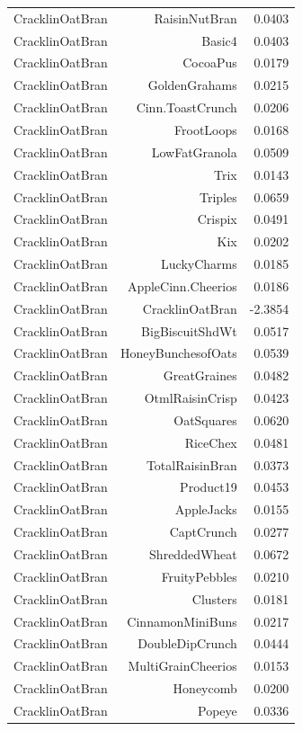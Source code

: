 \begin{longtable}{@{}lrr@{}}
CracklinOatBran & RaisinNutBran & 0.0403 \\
CracklinOatBran & Basic4 & 0.0403 \\
CracklinOatBran & CocoaPus & 0.0179 \\
CracklinOatBran & GoldenGrahams & 0.0215 \\
CracklinOatBran & Cinn.ToastCrunch & 0.0206 \\
CracklinOatBran & FrootLoops & 0.0168 \\
CracklinOatBran & LowFatGranola & 0.0509 \\
CracklinOatBran & Trix & 0.0143 \\
CracklinOatBran & Triples & 0.0659 \\
CracklinOatBran & Crispix & 0.0491 \\
CracklinOatBran & Kix & 0.0202 \\
CracklinOatBran & LuckyCharms & 0.0185 \\
CracklinOatBran & AppleCinn.Cheerios & 0.0186 \\
CracklinOatBran & CracklinOatBran & -2.3854 \\
CracklinOatBran & BigBiscuitShdWt & 0.0517 \\
CracklinOatBran & HoneyBunchesofOats & 0.0539 \\
CracklinOatBran & GreatGraines & 0.0482 \\
CracklinOatBran & OtmlRaisinCrisp & 0.0423 \\
CracklinOatBran & OatSquares & 0.0620 \\
CracklinOatBran & RiceChex & 0.0481 \\
CracklinOatBran & TotalRaisinBran & 0.0373 \\
CracklinOatBran & Product19 & 0.0453 \\
CracklinOatBran & AppleJacks & 0.0155 \\
CracklinOatBran & CaptCrunch & 0.0277 \\
CracklinOatBran & ShreddedWheat & 0.0672 \\
CracklinOatBran & FruityPebbles & 0.0210 \\
CracklinOatBran & Clusters & 0.0181 \\
CracklinOatBran & CinnamonMiniBuns & 0.0217 \\
CracklinOatBran & DoubleDipCrunch & 0.0444 \\
CracklinOatBran & MultiGrainCheerios & 0.0153 \\
CracklinOatBran & Honeycomb & 0.0200 \\
CracklinOatBran & Popeye & 0.0336 \\

\end{longtable}
